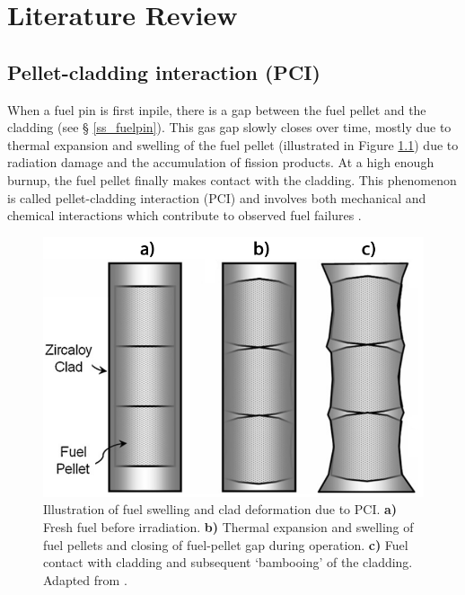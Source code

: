\chapter{Literature Review}

\label{literature_review}

\section{Pellet-cladding interaction (PCI)}

When a fuel pin is first inpile, there is a gap between the fuel pellet and the cladding (see § \ref{ss_fuelpin}). This gas gap slowly closes over time, mostly due to thermal expansion and swelling of the fuel pellet (illustrated in Figure \ref{figure:pcmi}) due to radiation damage and the accumulation of fission products. At a high enough burnup, the fuel pellet finally makes contact with the cladding. This phenomenon is called pellet-cladding interaction (PCI) and involves both mechanical and chemical interactions which contribute to observed fuel failures \cite{bcoxpelletclad1990}.

\begin{figure}[ht] %
\centering
\includegraphics[width=13cm]{images/pcmi.png}
\caption[Illustration of fuel swelling and clad deformation due to PCI. \textbf{a)} Fresh fuel before irradiation. \textbf{b)} Thermal expansion and swelling of fuel pellets and closing of fuel-pellet gap during operation. \textbf{c)} Fuel contact with cladding and subsequent `bambooing' of the cladding.]{Illustration of fuel swelling and clad deformation due to PCI. \textbf{a)} Fresh fuel before irradiation. \textbf{b)} Thermal expansion and swelling of fuel pellets and closing of fuel-pellet gap during operation. \textbf{c)} Fuel contact with cladding and subsequent `bambooing' of the cladding. Adapted from \cite{alam2011review}.}
\label{figure:pcmi}
\end{figure}

